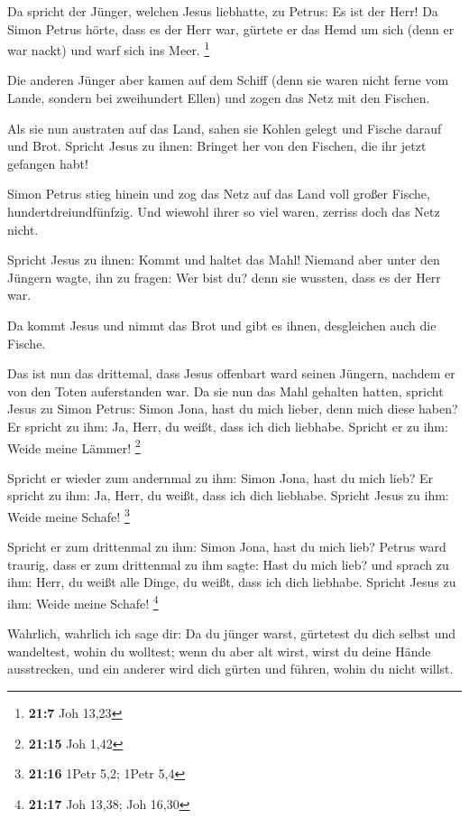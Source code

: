  Da spricht der Jünger, welchen Jesus liebhatte, zu Petrus:
Es ist der Herr! Da Simon Petrus hörte, dass es der Herr war, gürtete er
das Hemd um sich (denn er war nackt) und warf sich ins Meer. \footnote{\textbf{21:7}
  Joh 13,23}

 Die anderen Jünger aber kamen auf dem Schiff (denn sie
waren nicht ferne vom Lande, sondern bei zweihundert Ellen) und zogen
das Netz mit den Fischen.

 Als sie nun austraten auf das Land, sahen sie Kohlen gelegt
und Fische darauf und Brot.  Spricht Jesus zu ihnen:
Bringet her von den Fischen, die ihr jetzt gefangen habt!

 Simon Petrus stieg hinein und zog das Netz auf das Land
voll großer Fische, hundertdreiundfünfzig. Und wiewohl ihrer so viel
waren, zerriss doch das Netz nicht.

 Spricht Jesus zu ihnen: Kommt und haltet das Mahl! Niemand
aber unter den Jüngern wagte, ihn zu fragen: Wer bist du? denn sie
wussten, dass es der Herr war.

 Da kommt Jesus und nimmt das Brot und gibt es ihnen,
desgleichen auch die Fische.

 Das ist nun das drittemal, dass Jesus offenbart ward
seinen Jüngern, nachdem er von den Toten auferstanden war. 
Da sie nun das Mahl gehalten hatten, spricht Jesus zu Simon Petrus:
Simon Jona, hast du mich lieber, denn mich diese haben? Er spricht zu
ihm: Ja, Herr, du weißt, dass ich dich liebhabe. Spricht er zu ihm:
Weide meine Lämmer! \footnote{\textbf{21:15} Joh 1,42}

 Spricht er wieder zum andernmal zu ihm: Simon Jona, hast
du mich lieb? Er spricht zu ihm: Ja, Herr, du weißt, dass ich dich
liebhabe. Spricht Jesus zu ihm: Weide meine Schafe! \footnote{\textbf{21:16}
  1Petr 5,2; 1Petr 5,4}

 Spricht er zum drittenmal zu ihm: Simon Jona, hast du mich
lieb? Petrus ward traurig, dass er zum drittenmal zu ihm sagte: Hast du
mich lieb? und sprach zu ihm: Herr, du weißt alle Dinge, du weißt, dass
ich dich liebhabe. Spricht Jesus zu ihm: Weide meine Schafe! \footnote{\textbf{21:17}
  Joh 13,38; Joh 16,30}

 Wahrlich, wahrlich ich sage dir: Da du jünger warst,
gürtetest du dich selbst und wandeltest, wohin du wolltest; wenn du aber
alt wirst, wirst du deine Hände ausstrecken, und ein anderer wird dich
gürten und führen, wohin du nicht willst.

